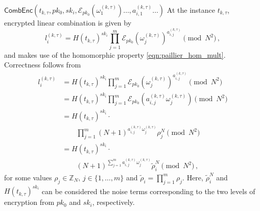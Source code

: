 \documentclass[10pt,letterpaper,oneside,twocolumn,journal]{IEEEtran}
\theoremstyle{definition}
\theoremstyle{definition}
\theoremstyle{remark}
\begin{document}
\begin{LaTeXdescription}
    \item[$\mathsf{CombEnc}(t_{k,\tau}, pk_0, sk_i, \mathcal{E}_{pk_0}(\omega_1^{(k,\tau)})\dots , a^{(k,\tau)}_{i,1}\dots )$] At the instance $t_{k,\tau}$, encrypted linear combination is given by 
    \begin{equation}
        l^{(k,\tau)}_i = H(t_{k,\tau})^{sk_i}\prod^{m}_{j=1}\mathcal{E}_{pk_0}(\omega^{(k,\tau)}_j)^{a^{(k,\tau)}_{i,j}} \pmod{N^2}\,,\label{eqn:our_scheme_lin_comb}
    \end{equation}
    and makes use of the homomorphic property \eqref{eqn:paillier_hom_mult}. Correctness follows from
    \begin{equation*}
        \begin{split}
            l^{(k,\tau)}_i &= H(t_{k,\tau})^{sk_i}\prod^{m}_{j=1}\mathcal{E}_{pk_0}(\omega^{(k,\tau)}_j)^{a^{(k,\tau)}_{i,j}} \pmod{N^2} \\
            &= H(t_{k,\tau})^{sk_i}\prod^{m}_{j=1}\mathcal{E}_{pk_0}(a^{(k,\tau)}_{i,j}\omega^{(k,\tau)}_j) \pmod{N^2} \\
            &= H(t_{k,\tau})^{sk_i}\cdot \\
            &\qquad \prod^{m}_{j=1}(N+1)^{a^{(k,\tau)}_{i,j}\omega^{(k,\tau)}_j} \rho^{N}_{j} \pmod{N^2} \\
            &= H(t_{k,\tau})^{sk_i}\cdot \\
            &\qquad (N+1)^{\sum^{m}_{j=1}a^{(k,\tau)}_{i,j}\omega^{(k,\tau)}_j} \tilde{\rho}_{i}^{N} \pmod{N^2}\,,
        \end{split}
    \end{equation*}
    for some values $\rho_j \in \mathbb{Z}_N,\,j\in\{1,\dots,m\}$ and $\tilde{\rho}_i=\prod^{m}_{j=1}\rho_j$. Here, $\tilde{\rho}_i^N$ and $H(t_{k,\tau})^{sk_i}$ can be considered the noise terms corresponding to the two levels of encryption from $pk_0$ and $sk_i$, respectively.


\end{LaTeXdescription}
\end{document}
